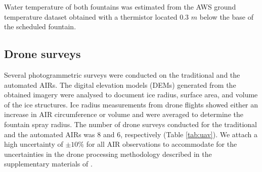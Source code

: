 \documentclass[tc, manuscript]{copernicus}
\begin{document}
Water temperature of both fountains was estimated from the AWS ground temperature dataset obtained with a thermistor located 0.3 $m$ below the base of the scheduled fountain.

\subsection{Drone surveys}

Several photogrammetric surveys were conducted on the traditional and the automated AIRs. The digital elevation
models (DEMs) generated from the obtained imagery were analysed to document ice radius, surface area, and
volume of the ice structures. Ice radius measurements from drone flights showed either an increase in
AIR circumference or volume and were averaged to determine the fountain spray radius. The number of drone surveys
conducted for the traditional and the automated AIRs was 8 and 6, respectively (Table \ref{tab:uav}). We
attach a high uncertainty of $\pm 10 \%$ for all AIR observations to accommodate for the uncertainties in
the drone processing methodology described in the supplementary materials of \citet{balasubramanianInfluenceMeteorologicalConditions2022}.
\end{document}
